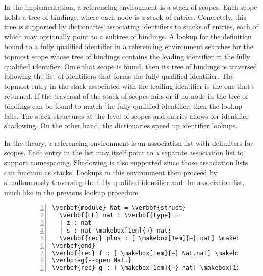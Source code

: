 In the implementation, a referencing environment is a stack of scopes.
Each scope holds a tree of bindings, where each node is a stack of entries.
Concretely, this tree is supported by dictionaries associating identifiers to stacks of entries, each of which may optionally point to a subtree of bindings.
A lookup for the definition bound to a fully qualified identifier in a referencing environment searches for the topmost scope whose tree of bindings contains the leading identifier in the fully qualified identifier.
Once that scope is found, then its tree of bindings is traversed following the list of identifiers that forms the fully qualified identifier.
The topmost entry in the stack associated with the trailing identifier is the one that's returned.
If the traversal of the stack of scopes fails or if no node in the tree of bindings can be found to match the fully qualified identifier, then the lookup fails.
The stack structures at the level of scopes and entries allows for identifier shadowing.
On the other hand, the dictionaries speed up identifier lookups.


In the theory, a referencing environment is an association list with delimiters for scopes.
Each entry in the list may itself point to a separate association list to support namespacing.
Shadowing is also supported since those association lists can function as stacks.
Lookups in this environment then proceed by simultaneously traversing the fully qualified identifier and the association list, much like in the previous lookup procedure.


\begin{figure}[htb]
\begin{Verbatim}[commandchars=\\\{\}, baselinestretch=1, numbers=left]
\verbbf{module} Nat = \verbbf{struct}
  \verbbf{LF} nat : \verbbf{type} =
  | z : nat
  | s : nat \makebox[1em]{→} nat;
  \verbbf{rec} plus : [ \makebox[1em]{⊢} nat] \makebox[1em]{→} [ \makebox[1em]{⊢} nat] \makebox[1em]{→} [ \makebox[1em]{⊢} nat] = \verbhole{?h1};
\verbbf{end}
\verbbf{rec} f : [ \makebox[1em]{⊢} Nat.nat] \makebox[1em]{→} [ \makebox[1em]{⊢} Nat.nat] = \verbhole{?h2};
\verbprag{--open Nat.}
\verbbf{rec} g : [ \makebox[1em]{⊢} nat] \makebox[1em]{→} [ \makebox[1em]{⊢} nat] = \verbhole{?h3};
\end{Verbatim}
\caption[]{%
}
\label{figure:referencing-environment-example}
\end{figure}

